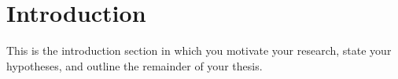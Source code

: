 \section{Introduction} \label{sec:intro}

This is the introduction section in which you motivate your research, state your hypotheses, and outline the remainder of your thesis.